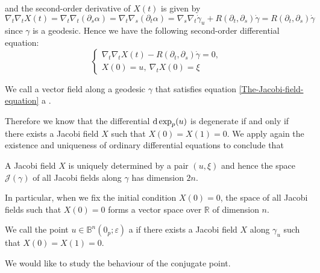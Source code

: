 and the second-order derivative of $X(t)$ is given by
\[
\nabla_t\nabla_t X(t)=\nabla_t\nabla_t (\partial_s\alpha )=\nabla_t\nabla_s (\partial_t\alpha )=\nabla_s\nabla_t\dot{\gamma }_u +R(\partial_t ,\partial_s )\dot{\gamma } =R(\partial_t ,\partial_s )\dot{\gamma }
\]
since $\gamma $ is a geodesic. Hence we have the following second-order differential equation:
\begin{equation}
    \label{The-Jacobi-field-equation}\left\{\begin{array}{l}
    \nabla_t\nabla_t X(t)-R(\partial_t ,\partial_s )\dot{\gamma } =0,\\
    X(0)=u,\ \nabla_t X(0)=\xi
    \end{array}\right.
\end{equation}
\begin{dfn}
We call a vector field along a geodesic $\gamma $ that satisfies equation \eqref{The-Jacobi-field-equation} a .
\end{dfn}
Therefore we know that the differential $\mathrm{d}\exp_p (u)$ is degenerate if and only if there exists a Jacobi field $X$ such that $X(0)=X(1)=0$. We apply again the existence and uniqueness of ordinary differential equations to conclude that
\begin{prp}
A Jacobi field $X$ is uniquely determined by a pair $(u,\xi )$ and hence the space $\mathcal{J} (\gamma )$ of all Jacobi fields along $\gamma $ has dimension $2n$.
\end{prp}
In particular, when we fix the initial condition $X(0)=0$, the space of all Jacobi fields such that $X(0)=0$ forms a vector space over $\mathbb{R} $ of dimension $n$.
\begin{dfn}
We call the point $u\in\mathbb{B}^n (0_p ;\varepsilon )$ a  if there exists a Jacobi field $X$ along $\gamma_u $ such that $X(0)=X(1)=0$.
\end{dfn}
We would like to study the behaviour of the conjugate point.
